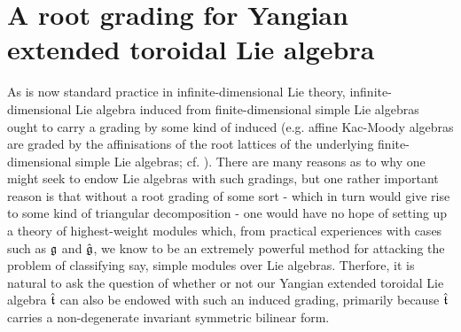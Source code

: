 \section{A root grading for Yangian extended toroidal Lie algebra}
    As is now standard practice in infinite-dimensional Lie theory, infinite-dimensional Lie algebra induced from finite-dimensional simple Lie algebras ought to carry a grading by some kind of induced  (e.g. affine Kac-Moody algebras are graded by the affinisations of the root lattices of the underlying finite-dimensional simple Lie algebras; cf. \cite[Chapter 6]{kac_infinite_dimensional_lie_algebras}). There are many reasons as to why one might seek to endow Lie algebras with such gradings, but one rather important reason is that without a root grading of some sort - which in turn would give rise to some kind of triangular decomposition - one would have no hope of setting up a theory of highest-weight modules which, from practical experiences with cases such as $\mathfrak{g}$ and $\hat{\mathfrak{g}}$, we know to be an extremely powerful method for attacking the problem of classifying say, simple modules over Lie algebras. Therfore, it is natural to ask the question of whether or not our Yangian extended toroidal Lie algebra $\hat{\mathfrak{t}}$ can also be endowed with such an induced grading, primarily because $\hat{\mathfrak{t}}$ carries a non-degenerate invariant symmetric bilinear form.

